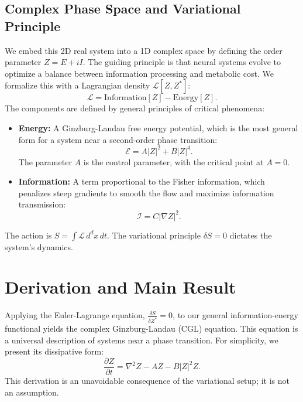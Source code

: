 \documentclass[12pt, reqno]{amsart}
\theoremstyle{definition}
\theoremstyle{remark}
\numberwithin{equation}{section}
\begin{document}
\subsection{Complex Phase Space and Variational Principle}
We embed this 2D real system into a 1D complex space by defining the order parameter $Z = E + iI$. The guiding principle is that neural systems evolve to optimize a balance between information processing and metabolic cost. We formalize this with a Lagrangian density $\mathcal{L}[Z, Z^*]$:
\begin{equation}
\mathcal{L} = \text{Information}[Z] - \text{Energy}[Z].
\end{equation}
The components are defined by general principles of critical phenomena:
\begin{itemize}
    \item \textbf{Energy:} A Ginzburg-Landau free energy potential, which is the most general form for a system near a second-order phase transition:
    \begin{equation}
        \mathcal{E} = A|Z|^2 + B|Z|^4.
    \end{equation}
    The parameter $A$ is the control parameter, with the critical point at $A=0$.
    \item \textbf{Information:} A term proportional to the Fisher information, which penalizes steep gradients to smooth the flow and maximize information transmission:
    \begin{equation}
        \mathcal{I} = C|\nabla Z|^2.
    \end{equation}
\end{itemize}
The action is $S = \int \mathcal{L} \,d^dx\,dt$. The variational principle $\delta S = 0$ dictates the system's dynamics.

\section{Derivation and Main Result}

Applying the Euler-Lagrange equation, $\frac{\delta S}{\delta Z^*} = 0$, to our general information-energy functional yields the complex Ginzburg-Landau (CGL) equation. This equation is a universal description of systems near a phase transition. For simplicity, we present its dissipative form:
\begin{equation}\label{eq:CGL}
\frac{\partial Z}{\partial t} = \nabla^2 Z - A Z - B |Z|^2 Z.
\end{equation}
This derivation is an unavoidable consequence of the variational setup; it is not an assumption.
\end{document}
